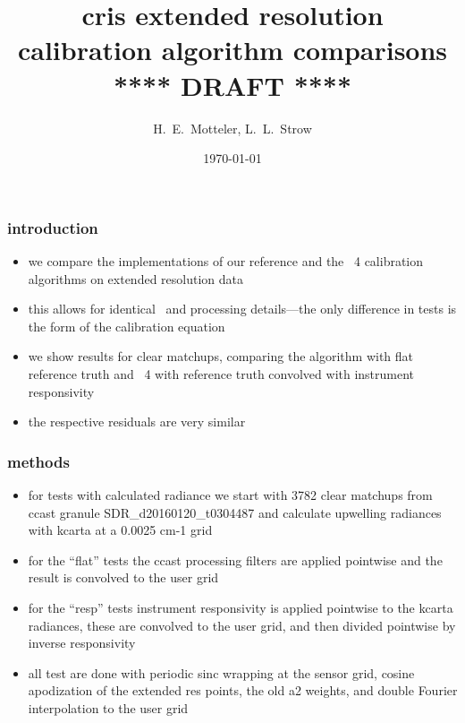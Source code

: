 \documentclass[11pt]{beamer}
\title{cris extended resolution \\
       calibration algorithm comparisons \\
\vspace{4mm}
{****} DRAFT {****} \\
}
\author{H.~E.~Motteler, L.~L.~Strow}
\institute{
  UMBC Atmospheric Spectroscopy Lab \\
  Joint Center for Earth Systems Technology \\
}
\date{\today}
\begin{document}
\begin{frame}[plain]
\titlepage
\end{frame}
\begin{frame}
\frametitle{introduction}

\begin{itemize}

  \item we compare the {\umbc} implementations of our {\ccast}
    reference and the \noaa~4 calibration algorithms on extended
    resolution data

  \item this allows for identical \ils\ and processing details---the
    only difference in tests is the form of the calibration equation

  \item we show results for clear matchups, comparing the {\ccast}
    algorithm with flat reference truth and \noaa~4 with reference
    truth convolved with instrument responsivity

  \item the respective residuals are very similar

\end{itemize}

\end{frame}
\begin{frame}
\frametitle{methods}

\begin{itemize}

  \item for tests with calculated radiance we start with 3782 clear
    matchups from ccast granule SDR\_d20160120\_t0304487 and
    calculate upwelling radiances with kcarta at a 0.0025 cm-1 grid

  \item for the ``flat'' tests the ccast processing filters are
    applied pointwise and the result is convolved to the {\cris}
    user grid

  \item for the ``resp'' tests instrument responsivity is applied
    pointwise to the kcarta radiances, these are convolved to the
    user grid, and then divided pointwise by inverse responsivity

    
  \item all test are done with periodic sinc wrapping at the sensor
    grid, cosine apodization of the extended res points, the old a2
    weights, and double Fourier interpolation to the user grid

\end{itemize}

\end{frame}
\end{document}
